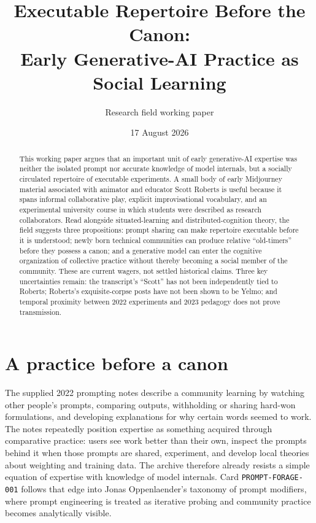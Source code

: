 \documentclass[11pt]{article}
\title{Executable Repertoire Before the Canon:\\Early Generative-AI Practice as Social Learning}
\author{Research field working paper}
\date{17 August 2026}
\begin{document}
\maketitle

\begin{abstract}
This working paper argues that an important unit of early generative-AI expertise was neither the isolated prompt nor accurate knowledge of model internals, but a socially circulated repertoire of executable experiments. A small body of early Midjourney material associated with animator and educator Scott Roberts is useful because it spans informal collaborative play, explicit improvisational vocabulary, and an experimental university course in which students were described as research collaborators. Read alongside situated-learning and distributed-cognition theory, the field suggests three propositions: prompt sharing can make repertoire executable before it is understood; newly born technical communities can produce relative ``old-timers'' before they possess a canon; and a generative model can enter the cognitive organization of collective practice without thereby becoming a social member of the community. These are current wagers, not settled historical claims. Three key uncertainties remain: the transcript's ``Scott'' has not been independently tied to Roberts; Roberts's exquisite-corpse posts have not been shown to be Yelmo; and temporal proximity between 2022 experiments and 2023 pedagogy does not prove transmission.
\end{abstract}

\section{A practice before a canon}

The supplied 2022 prompting notes describe a community learning by watching other people's prompts, comparing outputs, withholding or sharing hard-won formulations, and developing explanations for why certain words seemed to work. The notes repeatedly position expertise as something acquired through comparative practice: users see work better than their own, inspect the prompts behind it when those prompts are shared, experiment, and develop local theories about weighting and training data. The archive therefore already resists a simple equation of expertise with knowledge of model internals. Card \texttt{PROMPT-FORAGE-001} follows that edge into Jonas Oppenlaender's taxonomy of prompt modifiers, where prompt engineering is treated as iterative probing and community practice becomes analytically visible.
\end{document}
